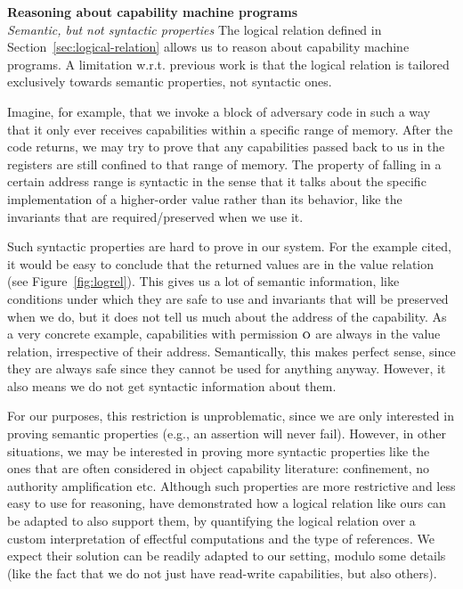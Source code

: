\documentclass[format=acmsmall, review=false, screen=true]{acmart}
\renewcommand{\figurename}{Figure}
\renewcommand{\sectionname}{Section}
\newcommand{\plainperm}[1]{\textsc{#1}}
\newcommand{\noperm}{\plainperm{o}}
\newenvironment{toplas}
    {\color{OliveGreen}
          
    }{}
\begin{document}
\begin{toplas}
\noindent \textbf{Reasoning about capability machine programs}\\
\emph{Semantic, but not syntactic properties} The logical relation defined in
\sectionname~\ref{sec:logical-relation} allows us to reason about capability machine
programs. A limitation w.r.t. previous work is that the logical relation is
tailored exclusively towards semantic properties, not syntactic ones.

Imagine, for example, that we invoke a block of adversary code in such a way
that it only ever receives capabilities within a specific range of memory. After
the code returns, we may try to prove that any capabilities passed back to us in
the registers are still confined to that range of memory. The property of
falling in a certain address range is syntactic in the sense that it talks about
the specific implementation of a higher-order value rather than its behavior,
like the invariants that are required/preserved when we use it.

Such syntactic properties are hard to prove in our system. For the example
cited, it would be easy to conclude that the returned values are in the value
relation (see \figurename~\ref{fig:logrel}). This gives us a lot of semantic
information, like conditions under which they are safe to use and invariants
that will be preserved when we do, but it does not tell us much about the
address of the capability. As a very concrete example, capabilities with
permission $\noperm$ are always in the value relation, irrespective of their
address. Semantically, this makes perfect sense, since they are always safe
since they cannot be used for anything anyway. However, it also means we do not
get syntactic information about them.

For our purposes, this restriction is unproblematic, since we are only
interested in proving semantic properties (e.g., an assertion will never fail).
However, in other situations, we may be interested in proving more syntactic
properties like the ones that are often considered in object capability
literature: confinement, no authority amplification etc. Although such
properties are more restrictive and less easy to use for reasoning,
\citet{Devriese:2016ObjCap} have demonstrated how a logical relation like
ours can be adapted to also support them, by quantifying the logical relation
over a custom interpretation of effectful computations and the type of
references. We expect their solution can be readily adapted to our setting,
modulo some details (like the fact that we do not just have read-write
capabilities, but also others).
\end{toplas}
\end{document}
